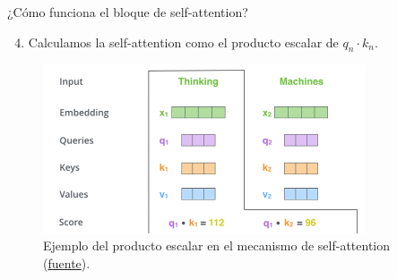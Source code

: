 \begin{frame}{¿Cómo funciona el bloque de self-attention?}

\begin{enumerate}
\setcounter{enumi}{3}
    \item Calculamos la self-attention como el producto escalar de $q_n\cdot k_n$. 
\end{enumerate}

\begin{figure}
    \centering
    \includegraphics[width=0.85\textwidth]{Slides/figures/02_Metodos_Generativos/trans-att3.png}
    \caption{Ejemplo del producto escalar en el mecanismo de self-attention (\href{http://jalammar.github.io/illustrated-transformer/}{fuente}).}
\end{figure}

\end{frame}


